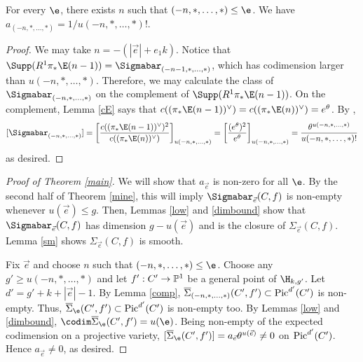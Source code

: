 \begin{Lemma}
\notready \label{comp}
For every $\e$, there exists $n$ such that $(-n, *, \ldots, *)\leq \e$.
We have $a_{(-n,*,\ldots, *)} = 1/u(-n,*,\ldots,*)!$.
\end{Lemma}
\begin{proof}
We may take $n = -(|\vec{e}| + e_1k)$.
Notice that $\Supp(R^1\pi_*\E(n-1)) = \Sigmabar_{(-n-1, *, \ldots, *)}$, which has codimension larger than $u(-n, *, \ldots, *)$. Therefore, we may calculate the class of $\Sigmabar_{(-n,*, \ldots, *)}$ on the complement of $\Supp(R^1\pi_*\E(n-1))$. On the complement, Lemma \ref{cE} says that $c((\pi_*\E(n-1))^\vee) = c((\pi_*\E(n))^\vee)  = e^{\theta}$.
By \cite[Lemma 5.1]{L},
\[[\Sigmabar_{(-n,*, \ldots, *)}] = \left[\frac{c((\pi_*\E(n-1))^\vee)^2}{c((\pi_* \E(n))^\vee)} \right]_{u(-n,*,\ldots, *)} = \left[\frac{(e^{\theta})^2}{e^\theta}\right]_{u(-n,*,\ldots, *)}=  \frac{\theta^{u(-n,*,\ldots,*)}}{u(-n,*,\ldots,*)!}\]
as desired.
\end{proof}

\begin{proof}[Proof of Theorem \ref{main}]
We will show that $a_{\vec{e}}$ is non-zero for all $\e$. By the second half of Theorem \ref{mine}, this will imply $\Sigmabar_{\vec{e}}(C, f)$ is non-empty whenever $u(\vec{e}) \leq g$. Then, Lemmas \ref{low} and \ref{dimbound} show that $\Sigmabar_{\vec{e}}(C, f)$ has dimension $g - u(\vec{e})$ and is the closure of $\Sigma_{\vec{e}}(C, f)$. Lemma \ref{sm} shows $\Sigma_{\vec{e}}(C, f)$ is smooth.

Fix $\vec{e}$ and choose $n$ such that $(-n, *, \ldots, *) \leq \e$. Choose any $g' \geq u(-n, *, \ldots, *)$ and let $f': C' \rightarrow \mathbb{P}^1$ be a general point of $\H_{k,g'}$. Let $d' = g' + k + |\vec{e}| - 1$. By Lemma \ref{comp}, $\overline{\Sigma}_{(-n, *, \ldots, *)}(C',f') \subset \operatorname{Pic}^{d'}(C')$ is non-empty. Thus, $\overline{\Sigma}_{\e}(C', f') \subset \Pic^{d'}(C')$ is non-empty too. By Lemmas \ref{low} and \ref{dimbound}, $\codim \overline{\Sigma}_{\e}(C', f') = u(\e)$. Being non-empty of the expected codimension on a projective variety, $[\overline{\Sigma}_{\e}(C', f') ] = a_{\vec{e}} \theta^{u(\vec{e})} \neq 0$ on $\operatorname{Pic}^{d'}(C')$. Hence $a_{\vec{e}} \neq 0$, as desired.
\end{proof}
